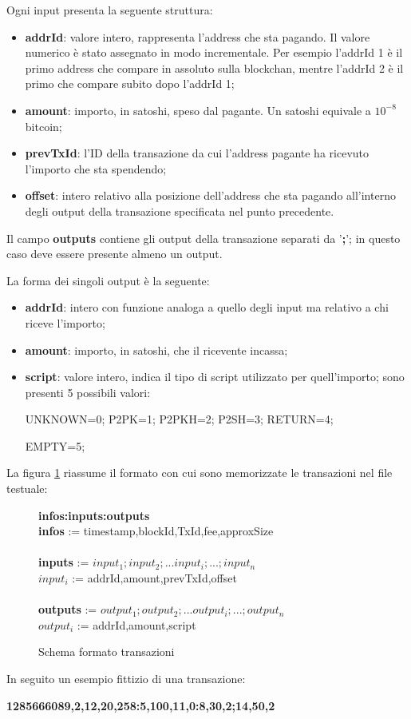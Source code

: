 Ogni input presenta la seguente struttura:
\begin{itemize}
    \item \textbf{addrId}: valore intero, rappresenta l'address che sta pagando. Il valore numerico è stato assegnato in modo incrementale.
    Per esempio l'addrId 1 è il primo address che compare in assoluto sulla blockchan, mentre l'addrId 2 è il primo che compare subito dopo l'addrId 1;
    \item \textbf{amount}: importo, in satoshi, speso dal pagante. Un satoshi equivale a $10^{-8}$ bitcoin; 
    \item \textbf{prevTxId}: l'ID della transazione da cui l’address pagante ha ricevuto l’importo che sta spendendo;
    \item \textbf{offset}: intero relativo alla posizione dell’address che sta pagando all’interno degli output della transazione specificata nel punto precedente.
\end{itemize}
Il campo \textbf{outputs} contiene gli output della transazione separati da '\textbf{;}'; in questo caso deve essere presente almeno un output.

La forma dei singoli output è la seguente:
\begin{itemize}
    \item \textbf{addrId}: intero con funzione analoga a quello degli input ma relativo a chi riceve l'importo; 
    \item \textbf{amount}: importo, in satoshi, che il ricevente incassa;
    \item \textbf{script}: valore intero, indica il tipo di script utilizzato per quell'importo; sono presenti 5 possibili valori: 
    
    UNKNOWN=0; P2PK=1; P2PKH=2; P2SH=3; RETURN=4;
    
    EMPTY=5;
\end{itemize}
La figura \ref{tx} riassume il formato con cui sono memorizzate le transazioni nel file testuale:
\begin{figure}[h]
\begin{mdframed}
\textbf{infos:inputs:outputs}\\
\textbf{infos} := timestamp,blockId,TxId,fee,approxSize\\\\
\textbf{inputs} := $input_1;input_2;...input_i;...;input_n$\\
$input_i$ := addrId,amount,prevTxId,offset\\\\
\textbf{outputs} := $output_1;output_2;...output_i;...;output_n$\\
$output_i$ := addrId,amount,script
\end{mdframed}
\caption{Schema formato transazioni}
\label{tx}
\end{figure}
\FloatBarrier
In seguito un esempio fittizio di una transazione:
\begin{center}
\textbf{1285666089,2,12,20,258:5,100,11,0:8,30,2;14,50,2}
\end{center}

